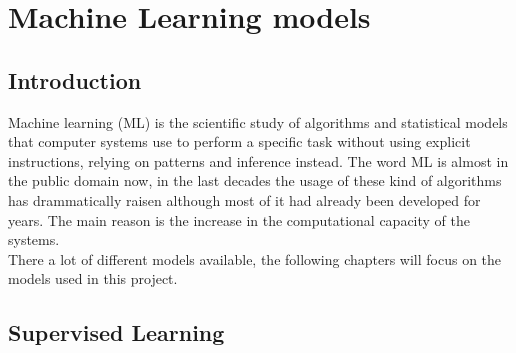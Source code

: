 \documentclass[%
    corpo=12pt,
    twoside,
    oldstyle,
    autoretitolo,
    greek,
    evenboxes,
]{toptesi}
\begin{document}

\chapter{Machine Learning models}
\section{Introduction}
Machine learning (ML) is the scientific study of algorithms and statistical models that computer systems use to perform a specific task without using explicit instructions, relying on patterns and inference instead\cite{ml}. The word ML is almost in the public domain now, in the last decades the usage of these kind of algorithms has drammatically raisen although most of it had already been developed for years. The main reason is the increase in the computational capacity of the systems.\\
There a lot of different models available, the following chapters will focus on the models used in this project.

\section{Supervised Learning}
\end{document}

